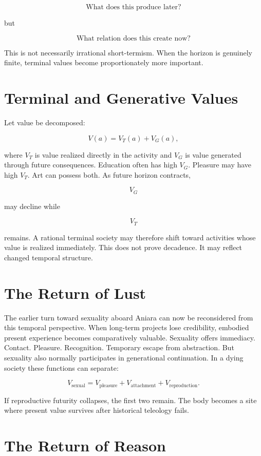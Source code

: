 \documentclass[11pt,oneside]{book}
\theoremstyle{definition}
\theoremstyle{remark}
\begin{document}
\[
\text{What does this produce later?}
\]

but

\[
\text{What relation does this create now?}
\]

This is not necessarily irrational short-termism. When the horizon is genuinely finite, terminal
values become proportionately more important.

\section{Terminal and Generative Values}

Let value be decomposed:

\[
V(a) = V_T(a) + V_G(a),
\]

where \(V_T\) is value realized directly in the activity and \(V_G\) is value generated through
future consequences. Education often has high \(V_G\). Pleasure may have high \(V_T\). Art can
possess both. As future horizon contracts,

\[
V_G
\]

may decline while

\[
V_T
\]

remains. A rational terminal society may therefore shift toward activities whose value is realized
immediately. This does not prove decadence. It may reflect changed temporal structure.

\section{The Return of Lust}

The earlier turn toward sexuality aboard Aniara can now be reconsidered from this temporal
perspective. When long-term projects lose credibility, embodied present experience becomes
comparatively valuable. Sexuality offers immediacy. Contact. Pleasure. Recognition. Temporary escape
from abstraction. But sexuality also normally participates in generational continuation. In a dying
society these functions can separate:

\[
V_{\mathrm{sexual}} = V_{\mathrm{pleasure}} + V_{\mathrm{attachment}} + V_{\mathrm{reproduction}}.
\]

If reproductive futurity collapses, the first two remain. The body becomes a site where present
value survives after historical teleology fails.

\section{The Return of Reason}
\end{document}
